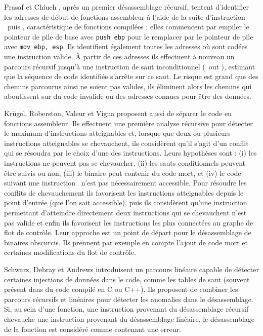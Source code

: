 Prasaf et Chiueh \cite{PC03}, après un premier désassemblage récursif, tentent d'identifier les adresses de début de fonctions assembleur à l'aide de la suite d'instruction \push\ puis \mov, caractéristique de fonctions compilées : elles commencent par empiler le pointeur de pile de base avec \texttt{push ebp} pour le remplacer par le pointeur de pile avec \texttt{mov ebp, esp}. Ils identifient également toutes les adresses où sont codées une instruction valide. À partir de ces adresses ils effectuent à nouveau un parcours récursif jusqu'à une instruction de saut inconditionnel (\ret\ out \jmp), estimant que la séquence de code identifiée s'arrête sur ce saut. Le risque est grand que des chemins parcourus ainsi ne soient pas valides, ils éliminent alors les chemins qui aboutissent sur du code invalide ou des adresses connues pour être des données.

Krügel, Roberston, Valeur et Vigna \cite{KruegelRVV04} proposent aussi de séparer le code en fonctions assembleur. Ils effectuent une première analyse récursive pour détecter le maximum d'instructions atteignables et, lorsque que deux ou plusieurs instructions atteignables se chevauchent, ils considèrent qu'il s'agit d'un conflit qui se résoudra par le choix d'une des instructions.
Leurs hypothèses sont : (i) les instructions ne peuvent pas se chevaucher, (ii) les sauts conditionnels peuvent être suivis ou non, (iii) le binaire peut contenir du code mort, et (iv) le code suivant une instruction \call\ n'est pas nécessairement accessible. Pour résoudre les conflits de chevauchement ils favorisent les instructions atteignables depuis le point d'entrée (que l'on sait accessible), puis ils considèrent qu'une instruction permettant d'atteindre directement deux instructions qui se chevauchent n'est pas valide et enfin ils favorisent les instructions les plus connectées au graphe de flot de contrôle.
Leur approche est un point de départ pour le désassemblage de binaires obscurcis. Ils prennent par exemple en compte l'ajout de code mort et certaines modifications du flot de contrôle.

Schwarz, Debray et Andrews \cite{SDA02} introduisent un parcours linéaire capable de détecter certaines injections de données dans le code, comme les tables de saut (souvent présent dans du code compilé en C ou C++). Ils proposent de combiner les parcours récursifs et linéaires pour détecter les anomalies dans le désassemblage. Si, au sein d'une fonction, une instruction provenant du désassemblage récursif chevauche une instruction provenant du désassemblage linéaire, le désassemblage de la fonction est considéré comme contenant une erreur.


